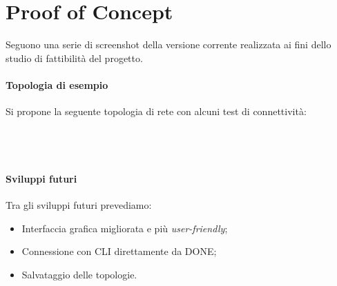 \section{Proof of Concept}
Seguono una serie di screenshot della versione corrente realizzata ai fini dello studio di fattibilità del progetto.
\paragraph*{Topologia di esempio}
Si propone la seguente topologia di rete con alcuni test di connettività:
\newline\\
\newline\\
\newline\\
\newline\\

\paragraph*{Sviluppi futuri}
Tra gli sviluppi futuri prevediamo:
\begin{itemize}
    \item Interfaccia grafica migliorata e più \textit{user-friendly};
    \item Connessione con CLI direttamente da DONE;
    \item Salvataggio delle topologie.
\end{itemize}




\newpage